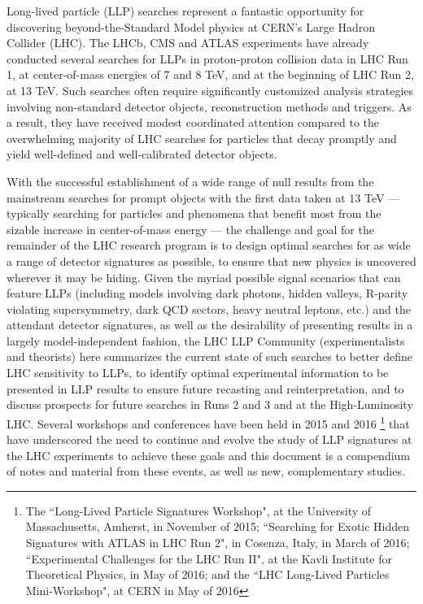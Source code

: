 Long-lived particle (LLP) searches represent a fantastic opportunity for discovering beyond-the-Standard Model physics at CERN's Large Hadron Collider (LHC).  The LHCb, CMS and ATLAS experiments have already conducted several searches for LLPs in proton-proton collision data in LHC Run 1, at center-of-mass energies of 7 and 8 TeV, and at the beginning of LHC Run 2, at 13 TeV.  Such searches often require significantly customized analysis strategies involving non-standard detector objects, reconstruction methods and triggers.  As a result, they have received modest coordinated attention compared to the overwhelming majority of LHC searches for particles that decay promptly and yield well-defined and well-calibrated detector objects.

With the successful establishment of a wide range of null results from the mainstream searches for prompt objects with the first data taken at 13 TeV --- typically searching for particles and phenomena that benefit most from the sizable increase in center-of-mass energy --- the challenge and goal for the remainder of the LHC research program is to design optimal searches for as wide a range of detector signatures as possible, to ensure that new physics is uncovered wherever it may be hiding.  Given the myriad possible signal scenarios that can feature LLPs (including models involving dark photons, hidden valleys, R-parity violating supersymmetry, dark QCD sectors, heavy neutral leptons, etc.) and the attendant detector signatures, as well as the desirability of presenting results in a largely model-independent fashion, the LHC LLP Community (experimentalists and theorists) here summarizes the current state of such searches to better define LHC sensitivity to LLPs, to identify optimal experimental information to be presented in LLP results to ensure future recasting and reinterpretation, and to discuss prospects for future searches in Runs 2 and 3 and at the High-Luminosity LHC.  Several workshops and conferences have been held in 2015 and 2016 \footnote{The ``Long-Lived Particle Signatures Workshop", at the University of Massachusetts, Amherst, in November of 2015; ``Searching for Exotic Hidden Signatures with ATLAS in LHC Run 2", in Cosenza, Italy, in March of 2016; ``Experimental Challenges for the LHC Run II", at the Kavli Institute for Theoretical Physics, in May of 2016; and the ``LHC Long-Lived Particles Mini-Workshop", at CERN in May of 2016} that have underscored the need to continue and evolve the study of LLP signatures at the LHC experiments to achieve these goals and this document is a compendium of notes and material from these events, as well as new, complementary studies.

